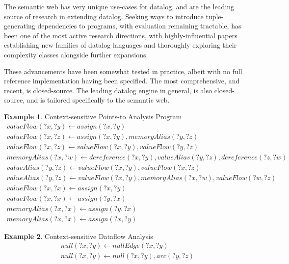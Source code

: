 \documentclass[sigconf,screen,review,natbib]{acmart}
\theoremstyle{definition}
\newtheorem{exmp}{Example}[section]
\begin{document}
The semantic web has very unique use-cases for datalog, and are the leading source of research in extending datalog. Seeking ways to introduce tuple-generating dependencies to
programs, with evaluation remaining tractable, has been one of the most active research directions, with highly-influential papers establishing new families of datalog
languages\cite{datalog_plus_minus} and thoroughly exploring their complexity classes alongside further expansions\cite{sticky,warded,monadic}.

These advancements have been somewhat tested in practice, albeit with no full reference implementation having been specified. The most comprehensive, and recent, is closed-source\cite{vadalog}.
The leading datalog engine in general, is also closed-source\cite{rdfox}, and is tailored specifically to the semantic web.

\begin{exmp}{Context-sensitive Points-to Analysis Program}
	\tiny
	\begin{align}
		valueFlow(?x, ?y) \leftarrow assign(?x, ?y)                                                 \\
		valueFlow(?x, ?z) \leftarrow assign(?x, ?y), memoryAlias(?y, ?z)                            \\
		valueFlow(?x, ?z) \leftarrow valueFlow(?x, ?y), valueFlow(?y, ?z)                           \\
		memoryAlias(?x, ?w) \leftarrow dereference(?x, ?y), valueAlias(?y, ?z), dereference(?z, ?w) \\
		valueAlias(?y, ?z) \leftarrow valueFlow(?x, ?y), valueFlow(?x, ?z)                          \\
		valueAlias(?y, ?z) \leftarrow valueFlow(?x, ?y), memoryAlias(?x, ?w), valueFlow(?w, ?z)     \\
		valueFlow(?x, ?x) \leftarrow assign(?x, ?y)                                                 \\
		valueFlow(?x, ?x) \leftarrow assign(?y, ?x)                                                 \\
		memoryAlias(?x, ?x) \leftarrow assign(?y, ?x)                                               \\
		memoryAlias(?x, ?x) \leftarrow assign(?x, ?y)
	\end{align}
	\label{program:cspa}
\end{exmp}

\begin{exmp}{Context-sensitive Dataflow Analysis}
	\tiny
	\begin{align}
		null(?x, ?y) \leftarrow nullEdge(?x, ?y) \\
		null(?x, ?y) \leftarrow null(?x, ?y), arc(?y, ?z)
	\end{align}
	\label{program:csda}
\end{exmp}
\end{document}
